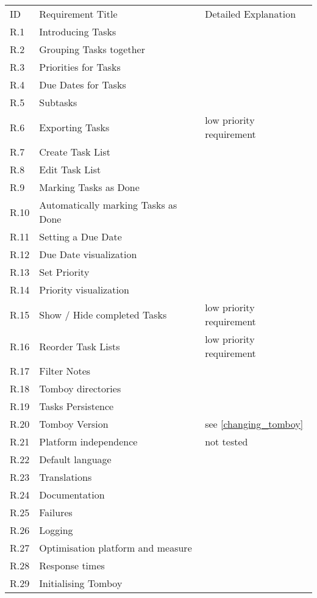 \begin{tabular}{lll}
\rowcolor[gray]{0.9}
ID  & Requirement Title   & Detailed Explanation	\\
\completed	R.1		& Introducing Tasks   & 						\\
\completed	R.2		& Grouping Tasks together & \\
\completed	R.3		& Priorities for Tasks & \\
\completed	R.4		& Due Dates for Tasks & \\
\completed	R.5		& Subtasks & \\
\notdone	R.6		& Exporting Tasks & low priority requirement\\
\completed	R.7		& Create Task List & \\
\completed	R.8		& Edit Task List & \\
\completed	R.9		& Marking Tasks as Done & \\
\completed	R.10	& Automatically marking Tasks as Done & \\
\completed	R.11	& Setting a Due Date & \\
\parts		R.12	& Due Date visualization & \\
\completed	R.13	& Set Priority & \\
\completed	R.14	& Priority visualization & \\
\notdone	R.15	& Show / Hide completed Tasks & low priority requirement \\
\notdone	R.16	& Reorder Task Lists & low priority requirement\\
\completed	R.17	& Filter Notes & \\
\completed	R.18	& Tomboy directories & \\
\completed	R.19	& Tasks Persistence & \\
\notdone	R.20	& Tomboy Version & see \ref{changing_tomboy}\\
\parts		R.21	& Platform independence & not tested\\
\completed	R.22	& Default language & \\
\completed	R.23	& Translations & \\
\completed	R.24	& Documentation & \\
\completed	R.25	& Failures & \\
\completed	R.26	& Logging & \\
\completed	R.27	& Optimisation platform and measure & \\
\completed	R.28	& Response times & \\
\completed	R.29	& Initialising Tomboy & \\

\end{tabular}
